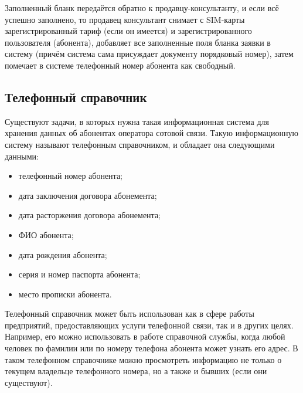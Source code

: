 Заполненный бланк передаётся обратно к продавцу-консультанту, и если всё успешно заполнено, то продавец консультант снимает с SIM-карты зарегистрированный тариф (если он имеется) и зарегистрированного пользователя (абонента), добавляет все заполненные поля бланка заявки в систему (причём система сама присуждает документу порядковый номер), затем помечает в системе телефонный номер абонента как свободный.


\subsection{Телефонный справочник}\label{subsec:phonebook}


Существуют задачи, в которых нужна такая информационная система для хранения данных об абонентах оператора сотовой связи. Такую информационную систему называют телефонным справочником, и обладает она следующими данными:
\begin{itemize}
    \item телефонный номер абонента;
    \item дата заключения договора абонемента;
    \item дата расторжения договора абонемента;
    \item ФИО абонента;
    \item дата рождения абонента;
    \item серия и номер паспорта абонента;
    \item место прописки абонента.
\end{itemize}

Телефонный справочник может быть использован как в сфере работы предприятий, предоставляющих услуги телефонной связи, так и в других целях. Например, его можно использовать в работе справочной службы, когда любой человек по фамилии или по номеру телефона абонента может узнать его адрес. В таком телефонном справочнике можно просмотреть информацию не только о текущем владельце телефонного номера, но а также и бывших (если они существуют).